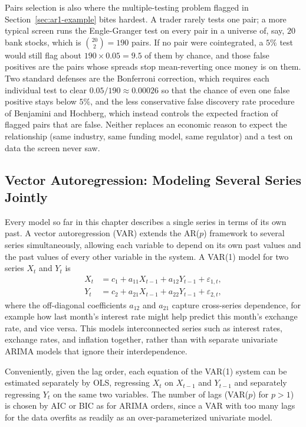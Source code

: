 \documentclass[../ai_in_finance]{subfiles}
\begin{document}
Pairs selection is also where the multiple-testing problem flagged in Section~\ref{sec:ar1-example} bites hardest. A trader rarely tests one pair; a more typical screen runs the Engle-Granger test on every pair in a universe of, say, $20$ bank stocks, which is $\binom{20}{2} = 190$ pairs. If no pair were cointegrated, a $5\%$ test would still flag about $190 \times 0.05 = 9.5$ of them by chance, and those false positives are the pairs whose spreads stop mean-reverting once money is on them. Two standard defenses are the Bonferroni correction, which requires each individual test to clear $0.05/190 \approx 0.00026$ so that the chance of even one false positive stays below $5\%$, and the less conservative false discovery rate procedure of Benjamini and Hochberg, which instead controls the expected fraction of flagged pairs that are false. Neither replaces an economic reason to expect the relationship (same industry, same funding model, same regulator) and a test on data the screen never saw.

\subsection{Vector Autoregression: Modeling Several Series Jointly}

Every model so far in this chapter describes a single series in terms of its own past. A vector autoregression (VAR) extends the AR($p$) framework to several series simultaneously, allowing each variable to depend on its own past values and the past values of every other variable in the system. A VAR(1) model for two series $X_t$ and $Y_t$ is
\begin{align*}
X_t &= c_1 + a_{11} X_{t-1} + a_{12} Y_{t-1} + \varepsilon_{1,t}, \\
Y_t &= c_2 + a_{21} X_{t-1} + a_{22} Y_{t-1} + \varepsilon_{2,t},
\end{align*}
where the off-diagonal coefficients $a_{12}$ and $a_{21}$ capture cross-series dependence, for example how last month's interest rate might help predict this month's exchange rate, and vice versa. This models interconnected series such as interest rates, exchange rates, and inflation together, rather than with separate univariate ARIMA models that ignore their interdependence.

Conveniently, given the lag order, each equation of the VAR(1) system can be estimated separately by OLS, regressing $X_t$ on $X_{t-1}$ and $Y_{t-1}$ and separately regressing $Y_t$ on the same two variables. The number of lags (VAR($p$) for $p>1$) is chosen by AIC or BIC as for ARIMA orders, since a VAR with too many lags for the data overfits as readily as an over-parameterized univariate model.
\end{document}
